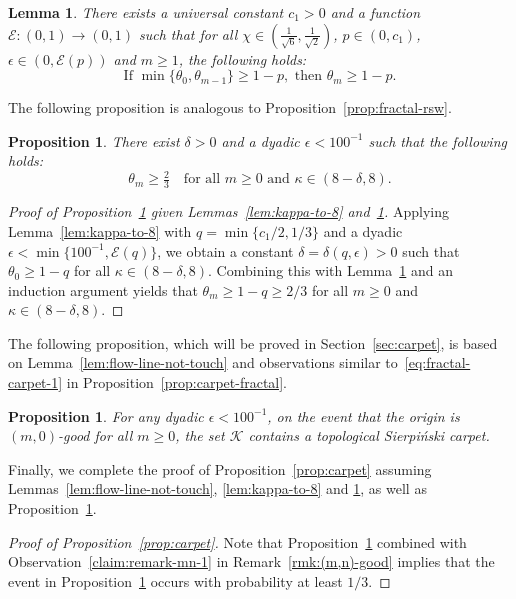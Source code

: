 \documentclass[a4paper]{article}
\numberwithin{equation}{section}
\newtheorem{lemma}[theorem]{Lemma}
\newtheorem{proposition}[theorem]{Proposition}
\numberwithin{equation}{section}
\renewcommand{\1}{\mathbf{1}}
\begin{document}
\begin{lemma}\label{lem:induction-bound}
    There exists a universal constant $c_1>0$ and a function $\mathcal{E}: (0,1) \to (0,1)$ such that for all $\chi \in (\frac{1}{\sqrt{6}}, \frac{1}{\sqrt{2}})$, $p \in (0, c_1)$, $\epsilon \in (0,  \mathcal{E}(p))$ and $m \geq 1$, the following holds:
    \[ \mbox{If } \min\{ \theta_0, \theta_{m-1}\} \geq 1-p, \mbox{ then } \theta_m \geq 1-p. \]
\end{lemma}

The following proposition is analogous to Proposition~\ref{prop:fractal-rsw}.

\begin{proposition}\label{prop:sle-rsw}
    There exist $\delta > 0$ and a dyadic $\epsilon < 100^{-1}$ such that the following holds:
    \[ \theta_m \geq \tfrac{2}{3} \quad \mbox{for all } m \geq 0 \mbox{ and } \kappa \in (8 - \delta,8). \]
\end{proposition}

\begin{proof}[Proof of Proposition~\ref{prop:sle-rsw} given Lemmas~\ref{lem:kappa-to-8} and~\ref{lem:induction-bound}]
    Applying Lemma~\ref{lem:kappa-to-8} with $q = \min \{c_1/2, 1/3 \}$ and a dyadic $\epsilon < \min \{100^{-1}, \mathcal E(q) \}$, we obtain a constant $\delta = \delta(q, \epsilon)>0$ such that $\theta_0 \geq 1-q$ for all $\kappa \in (8 - \delta, 8)$. Combining this with Lemma~\ref{lem:induction-bound} and an induction argument yields that $\theta_m \geq 1- q \geq 2/3$ for all $m \geq 0$ and $\kappa \in (8 - \delta, 8)$.
\end{proof}

The following proposition, which will be proved in Section~\ref{sec:carpet}, is based on Lemma~\ref{lem:flow-line-not-touch} and observations similar to~\eqref{eq:fractal-carpet-1} in Proposition~\ref{prop:carpet-fractal}.

\begin{proposition}\label{prop:find-carpet}
    For any dyadic $\epsilon<100^{-1}$, on the event that the origin is $(m,0)$-good for all $m \geq 0$, the set $\mathcal{K}$ contains a topological Sierpi\'nski carpet.
\end{proposition}

Finally, we complete the proof of Proposition~\ref{prop:carpet} assuming Lemmas~\ref{lem:flow-line-not-touch}, \ref{lem:kappa-to-8} and \ref{lem:induction-bound}, as well as Proposition~\ref{prop:find-carpet}.

\begin{proof}[Proof of Proposition~\ref{prop:carpet}]
    Note that Proposition~\ref{prop:sle-rsw} combined with Observation~\eqref{claim:remark-mn-1} in Remark~\ref{rmk:(m,n)-good} implies that the event in Proposition~\ref{prop:find-carpet} occurs with probability at least $1/3$.
\end{proof}
\end{document}
